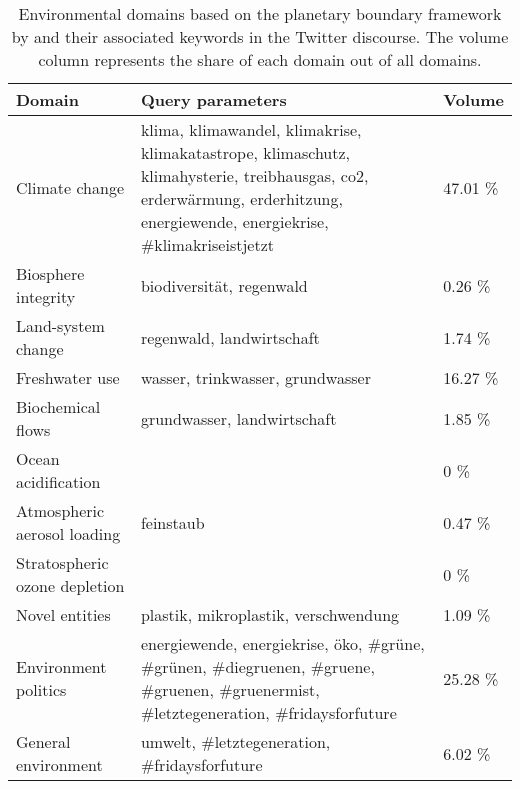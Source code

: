 \begin{table}[!htb]

\caption[Environmental domains and their associated keywords]{\label{tab:domains}Environmental domains based on the planetary boundary framework by \textcite{Steffen2015} and their associated keywords in the Twitter discourse. The volume column represents the share of each domain out of all domains.}
\centering
\begin{tabularx}{\textwidth}{lXl}
\toprule
Domain & Query parameters & Volume\\
\midrule
Climate change & klima, klimawandel, klimakrise, klimakatastrope, klimaschutz, klimahysterie, treibhausgas, co2, erderwärmung, erderhitzung, energiewende, energiekrise, \#klimakriseistjetzt & 47.01 \%\\
Biosphere integrity & biodiversität, regenwald & 0.26 \%\\
Land-system change & regenwald, landwirtschaft & 1.74 \%\\
Freshwater use & wasser, trinkwasser, grundwasser & 16.27 \%\\
Biochemical flows & grundwasser, landwirtschaft & 1.85 \%\\
\addlinespace
Ocean acidification &  & 0 \%\\
Atmospheric aerosol loading & feinstaub & 0.47 \%\\
Stratospheric ozone depletion &  & 0 \%\\
Novel entities & plastik, mikroplastik, verschwendung & 1.09 \%\\
Environment politics & energiewende, energiekrise, öko, \#grüne, \#grünen, \#diegruenen, \#gruene, \#gruenen, \#gruenermist, \#letztegeneration, \#fridaysforfuture & 25.28 \%\\
\addlinespace
General environment & umwelt, \#letztegeneration, \#fridaysforfuture & 6.02 \%\\
\bottomrule
\end{tabularx}
\end{table}